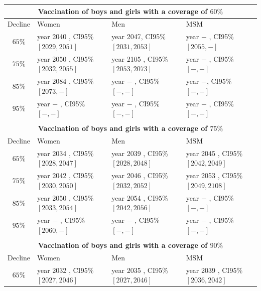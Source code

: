 \begin{table}[!h]
	\hspace*{-6em}%
	\centering
	\small
	\begin{tabular}{c|lll}
        \\
        \hline
        \multicolumn{4}{c}{\textbf{Vaccination of boys and girls with a coverage of $60\%$}}\\
        \hline
        Decline & Women &  Men & MSM \\ 
        \hline		
$ 65 \%$ & year  2040 , CI95\% $[ 2029 , 2051 ]$ & year  2047, CI95\% $[ 2031 , 2053 ]$ & year $-$ , CI95\% $[ 2055, - ]$ \\
$ 75 \%$ & year  2050 , CI95\% $[ 2032 , 2055 ]$ & year  2105 , CI95\% $[ 2053 , 2073 ]$ & year  $-$ , CI95\% $[ - , - ]$ \\
$ 85 \%$ & year  2084 , CI95\% $[ 2073 , - ]$ & year  $-$ , CI95\% $[ - , - ]$ & year  $-$, CI95\% $[ - , - ]$ \\
$ 95 \%$ & year  $-$ , CI95\% $[ - , - ]$ & year  $-$ , CI95\% $[ - , - ]$ & year  $-$ , CI95\% $[ - , - ]$ \\
		\\
		\hline 		
		\multicolumn{4}{c}{\textbf{Vaccination of boys and girls with a coverage of $75\%$}}\\
		\hline
		Decline & Women &  Men & MSM \\ 
		\hline 
$ 65 \%$ & year  2034 , CI95\% $[ 2028 , 2047 ]$ & year  2039 , CI95\% $[ 2028 , 2048 ]$ & year  2045 , CI95\% $[ 2042 , 2049 ]$ \\
$ 75 \%$ & year  2042 , CI95\% $[ 2030 , 2050 ]$ & year  2046 , CI95\% $[ 2032 , 2052 ]$ & year  2053 , CI95\% $[ 2049 , 2108 ]$ \\
$ 85 \%$ & year  2050 , CI95\% $[ 2033 , 2054 ]$ & year  2054 , CI95\% $[ 2042 , 2056 ]$ & year  $-$ , CI95\% $[ - , - ]$ \\
$ 95 \%$ & year  $-$ , CI95\% $[ 2060 , - ]$ & year  $-$ , CI95\% $[ - , - ]$ & year  $-$ , CI95\% $[ - , - ]$ \\
         \\
         \hline
         \multicolumn{4}{c}{\textbf{Vaccination of boys and girls with a coverage of $90\%$}}\\
         \hline
         Decline & Women &  Men & MSM \\ 
         \hline
$ 65 \%$ & year  2032 , CI95\% $[ 2027 , 2046 ]$ & year  2035 , CI95\% $[ 2027 , 2046 ]$ & year  2039 , CI95\% $[ 2036 , 2042 ]$ \\

\end{tabular}
\end{table}
